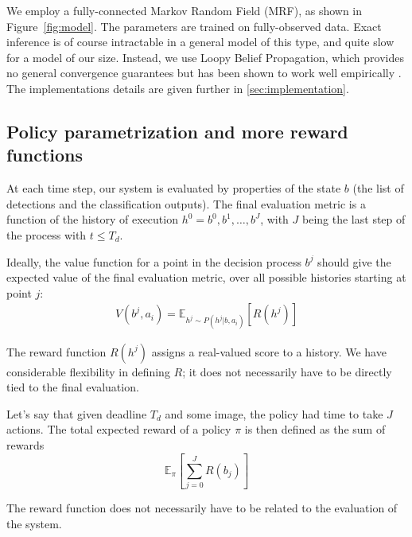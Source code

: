 We employ a fully-connected Markov Random Field (MRF), as shown in Figure~\ref{fig:model}.
The parameters are trained on fully-observed data.
Exact inference is of course intractable in a general model of this type, and quite slow for a model of our size.
Instead, we use Loopy Belief Propagation, which provides no general convergence guarantees but has been shown to work well empirically .
The implementations details are given further in \autoref{sec:implementation}.

\subsection{Policy parametrization and more reward functions}

At each time step, our system is evaluated by properties of the state $b$ (the list of detections and the classification outputs).
The final evaluation metric is a function of the history of execution $h^0=b^0,b^1,\dots,b^J$, with $J$ being the last step of the process with $t \le T_d$.

Ideally, the value function for a point in the decision process $b^j$ should give the expected value of the final evaluation metric, over all possible histories starting at point $j$:
\begin{align}
V(b^j,a_i) = \mathbb{E}_{h^j \sim P(h^j|b,a_i)}[R(h^j)]
\end{align}

The reward function $R(h^j)$ assigns a real-valued score to a history.
We have considerable flexibility in defining $R$; it does not necessarily have to be directly tied to the final evaluation.


Let's say that given deadline $T_d$ and some image, the policy had time to take $J$ actions.
The total expected reward of a policy $\pi$ is then defined as the sum of rewards
\begin{equation}
\mathbb{E}_\pi[\sum_{j=0}^J R(b_j)]
\end{equation}

The reward function does not necessarily have to be related to the evaluation of the system.

